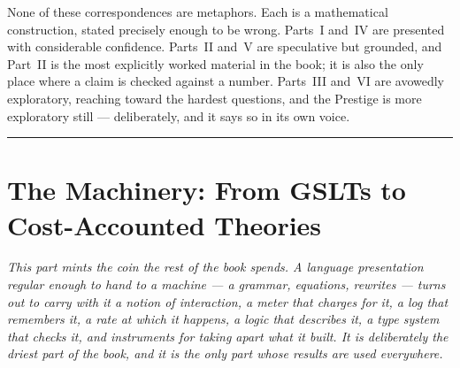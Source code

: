 \documentclass[12pt,openright,twoside]{book}
\theoremstyle{remark}
\theoremstyle{plain}
\theoremstyle{remark}
\theoremstyle{plain}
\theoremstyle{plain}
\begin{document}
None of these correspondences are metaphors.
Each is a mathematical construction, stated precisely enough to be wrong.
Parts~I and~IV are presented with considerable confidence.
Parts~II and~V are speculative but grounded, and Part~II is the most
explicitly worked material in the book; it is also the only place where a
claim is checked against a number.
Parts~III and~VI are avowedly exploratory, reaching toward the hardest
questions, and the Prestige is more exploratory still --- deliberately, and
it says so in its own voice.

\bigskip
\noindent\hrule
\bigskip


\part{The Machinery: From GSLTs to Cost-Accounted Theories}
\label{part:machinery}

\vspace{1em}
\begin{mdframed}[backgroundcolor=remarkgray, linecolor=gray!60,
                 linewidth=1pt, topline=false, rightline=false,
                 bottomline=false]
\small\itshape
This part mints the coin the rest of the book spends.
A language presentation regular enough to hand to a machine --- a
grammar, equations, rewrites --- turns out to carry with it a notion of
interaction, a meter that charges for it, a log that remembers it, a
rate at which it happens, a logic that describes it, a type system that
checks it, and instruments for taking apart what it built.
It is deliberately the driest part of the book, and it is the only part
whose results are used everywhere.
\end{mdframed}

\bigskip

\end{document}
